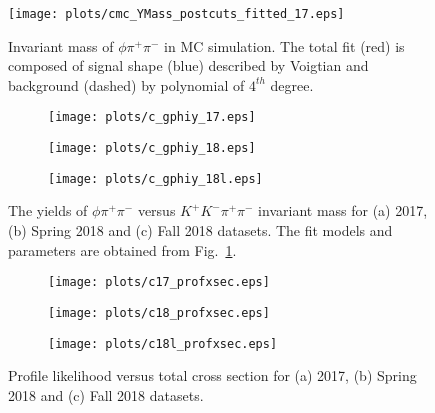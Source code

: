 \begin{figure}[H]
    \centering
    \texttt{[image: plots/cmc\_YMass\_postcuts\_fitted\_17.eps]}
    \caption{\label{fig.xsec_ul.yphi2pi.4}Invariant mass of $\phi \pi^+ \pi^-$ in MC simulation. The total fit (red) is composed of signal shape (blue) described by Voigtian and background (dashed) by polynomial of $4^{th}$ degree.}
\end{figure}

\begin{figure}[htbp]
    \centering
    \begin{subfigure}[b]{0.49\textwidth}
        \texttt{[image: plots/c\_gphiy\_17.eps]}
        \caption{}
        \label{fig.xsec_ul.yphi2pi.5.a}
    \end{subfigure}
    \begin{subfigure}[b]{0.49\textwidth}
        \texttt{[image: plots/c\_gphiy\_18.eps]}
        \caption{}
        \label{fig.xsec_ul.yphi2pi.5.b}
    \end{subfigure}
    \begin{subfigure}[b]{0.49\textwidth}
        \texttt{[image: plots/c\_gphiy\_18l.eps]}
        \caption{}
        \label{fig.xsec_ul.yphi2pi.5.c}
    \end{subfigure}
    \caption{The yields of $\phi \pi^+ \pi^-$ versus $K^{+}K^{-} \pi^+ \pi^-$ invariant mass for (a) 2017, (b) Spring 2018 and (c) Fall 2018 datasets. The fit models and parameters are obtained from Fig.~\ref{fig.xsec_ul.yphi2pi.4}.}
    \label{fig.xsec_ul.yphi2pi.5}
\end{figure}

\begin{figure}[htbp]
    \centering
    \begin{subfigure}[b]{0.49\textwidth}
        \texttt{[image: plots/c17\_profxsec.eps]}
        \caption{}
        \label{fig.xsec_ul.yphi2pi.6.a}
    \end{subfigure}
    \begin{subfigure}[b]{0.49\textwidth}
        \texttt{[image: plots/c18\_profxsec.eps]}
        \caption{}
        \label{fig.xsec_ul.yphi2pi.6.b}
    \end{subfigure}
    \begin{subfigure}[b]{0.49\textwidth}
        \texttt{[image: plots/c18l\_profxsec.eps]}
        \caption{}
        \label{fig.xsec_ul.yphi2pi.6.c}
    \end{subfigure}
    \caption{Profile likelihood versus total cross section for (a) 2017, (b) Spring 2018 and (c) Fall 2018 datasets.}
    \label{fig.xsec_ul.yphi2pi.6}
\end{figure}

